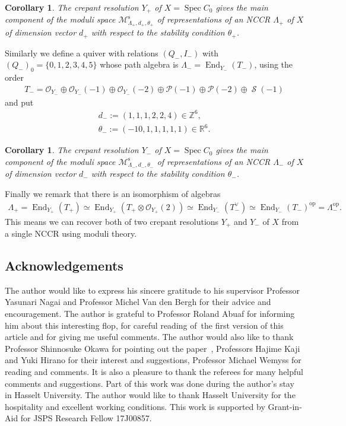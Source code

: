 \documentclass[pdftex]{sigma}
\DeclareMathOperator{\End}{End}
\DeclareMathOperator{\Spi}{\mathcal{S}}
\DeclareMathOperator{\Spec}{Spec}
\newcommand{\stsh}{\mathcal{O}}
\numberwithin{equation}{section}
\newtheorem{Corollary}[Theorem]{Corollary}
\begin{document}
\begin{Corollary}
The crepant resolution $Y_+$ of $X = \Spec C_0$ gives the main component of the moduli space $\mathcal{M}_{\Lambda_+, d_+, \theta_+}^{\mathrm{s}}$
of representations of an NCCR $\Lambda_+$ of $X$ of dimension vector $d_+$ with respect to the stability condition $\theta_+$.
\end{Corollary}

Similarly we define a quiver with relations $(Q_-, I_-)$ with $(Q_-)_0 = \{0,1,2,3,4,5\}$
whose path algebra is $\Lambda_- = \End_{Y_-}(T_-)$,
using the order
\begin{gather*}
T_- = \stsh_{Y_-} \oplus \stsh_{Y_-}(-1) \oplus \stsh_{Y_-}(-2) \oplus \mathcal{P}(-1) \oplus \mathcal{P}(-2) \oplus \Spi(-1)
\end{gather*}
and put
\begin{gather*}
d_- := (1,1,1,2 , 2, 4) \in \mathbb{Z}^{6}, \\
\theta_- := (-10, 1,1,1,1,1) \in \mathbb{R}^{6}.
\end{gather*}

\begin{Corollary}
The crepant resolution $Y_-$ of $X = \Spec C_0$ gives the main component of the moduli space $\mathcal{M}_{\Lambda_-, d_-, \theta_-}^{\mathrm{s}}$
of representations of an NCCR $\Lambda_-$ of $X$ of dimension vector $d_-$ with respect to the stability condition $\theta_-$.
\end{Corollary}

Finally we remark that there is an isomorphism of algebras
\begin{align*}
\Lambda_+ = \End_{Y_+}(T_+) \simeq \End_{Y_+}(T_+ \otimes \stsh_{Y_+}(2)) \simeq \End_{Y_-}(T_-^{\vee}) \simeq \End_{Y_-}(T_-)^{\mathrm{op}} = \Lambda_-^{\mathrm{op}}.
\end{align*}
This means we can recover both of two crepant resolutions $Y_+$ and $Y_-$ of $X$ from a single NCCR using moduli theory.

\subsection*{Acknowledgements}
The author would like to express his sincere gratitude to his supervisor Professor Yasunari Nagai and Professor Michel Van den Bergh
for their advice and encouragement.
The author is grateful to Professor Roland Abuaf for informing him about this interesting flop, for careful reading of~the first version of this article and for giving me useful comments.
The author would also like to thank Professor Shinnosuke Okawa for pointing out the paper~\cite{Ued16},
Professors Hajime Kaji and Yuki Hirano for their interest and suggestions,
Professor Michael Wemyss for reading and comments.
It is also a pleasure to thank the referees for many helpful comments and suggestions.
Part of this work was done during the author's stay in Hasselt University.
The author would like to thank Hasselt University for the hospitality and excellent working conditions.
This work is supported by Grant-in-Aid for JSPS Research Fellow 17J00857.
\end{document}
